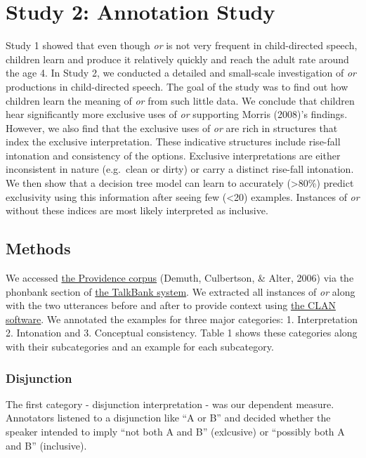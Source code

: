 \documentclass[10pt, letterpaper]{article}
\begin{document}
\section{Study 2: Annotation Study}\label{study-2-annotation-study}

Study 1 showed that even though \emph{or} is not very frequent in
child-directed speech, children learn and produce it relatively quickly
and reach the adult rate around the age 4. In Study 2, we conducted a
detailed and small-scale investigation of \emph{or} productions in
child-directed speech. The goal of the study was to find out how
children learn the meaning of \emph{or} from such little data. We
conclude that children hear significantly more exclusive uses of
\emph{or} supporting Morris (2008)'s findings. However, we also find
that the exclusive uses of \emph{or} are rich in structures that index
the exclusive interpretation. These indicative structures include
rise-fall intonation and consistency of the options. Exclusive
interpretations are either inconsistent in nature (e.g.~clean or dirty)
or carry a distinct rise-fall intonation. We then show that a decision
tree model can learn to accurately (\textgreater{}80\%) predict
exclusivity using this information after seeing few (\textless{}20)
examples. Instances of \emph{or} without these indices are most likely
interpreted as inclusive.

\subsection{Methods}\label{methods-1}

We accessed
\href{https://phonbank.talkbank.org/browser/index.php?url=Eng-NA/Providence/}{the
Providence corpus} (Demuth, Culbertson, \& Alter, 2006) via the phonbank
section of \href{https://talkbank.org/}{the TalkBank system}. We
extracted all instances of \emph{or} along with the two utterances
before and after to provide context using
\href{http://alpha.talkbank.org/clan/}{the CLAN software}. We annotated
the examples for three major categories: 1. Interpretation 2. Intonation
and 3. Conceptual consistency. Table 1 shows these categories along with
their subcategories and an example for each subcategory.

\subsubsection{Disjunction}\label{disjunction}

The first category - disjunction interpretation - was our dependent
measure. Annotators listened to a disjunction like ``A or B'' and
decided whether the speaker intended to imply ``not both A and B''
(exlcusive) or ``possibly both A and B'' (inclusive).
\end{document}
